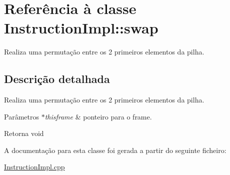 \hypertarget{class_instruction_impl_1_1swap}{}\section{Referência à classe Instruction\+Impl\+:\+:swap}
\label{class_instruction_impl_1_1swap}


Realiza uma permutação entre os 2 primeiros elementos da pilha.  




\subsection{Descrição detalhada}
Realiza uma permutação entre os 2 primeiros elementos da pilha. 


\begin{DoxyParams}{Parâmetros}
{\em $\ast$thisframe} & ponteiro para o frame. \\
\hline
\end{DoxyParams}
\begin{DoxyReturn}{Retorna}
void 
\end{DoxyReturn}


A documentação para esta classe foi gerada a partir do seguinte ficheiro\+:\begin{DoxyCompactItemize}
\item 
\hyperlink{_instruction_impl_8cpp}{Instruction\+Impl.\+cpp}\end{DoxyCompactItemize}
